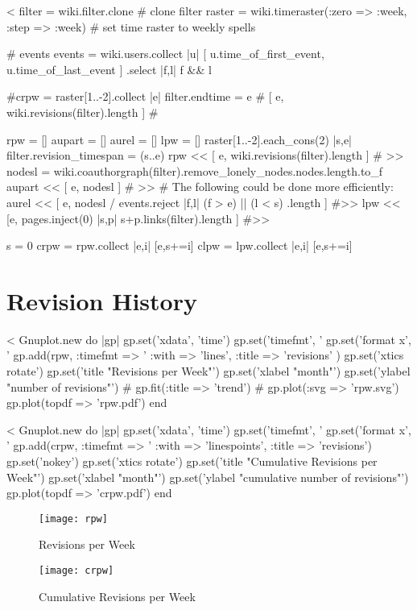 \documentclass{scrartcl}
\begin{document}

<%
filter = wiki.filter.clone # clone filter
raster = wiki.timeraster(:zero => :week, :step => :week) # set time raster to weekly spells

# events
events = wiki.users.collect{ |u| 
	[ u.time_of_first_event, u.time_of_last_event ] 
    }.select { |f,l| f && l }


#crpw = raster[1..-2].collect { |e| filter.endtime = e 
#  [ e, wiki.revisions(filter).length ]
#}

rpw = []
aupart = []
aurel = []
lpw = []
raster[1..-2].each_cons(2) { |s,e| 
  filter.revision_timespan = (s..e)
  rpw << [ e, wiki.revisions(filter).length ] # >>
  nodesl = wiki.coauthorgraph(filter).remove_lonely_nodes.nodes.length.to_f
  aupart << [ e, nodesl ] # >>
  # The following could be done more efficiently:
  aurel << [ e, nodesl / 
                events.reject { |f,l| (f > e) || (l < s) }.length ] #>>
  lpw << [e, pages.inject(0) { |s,p| s+p.links(filter).length } ] #>>
}

s = 0
crpw = rpw.collect { |e,i| [e,s+=i] }
clpw = lpw.collect { |e,i| [e,s+=i] }


\section{Revision History} %
\label{sec:revision_history}

<%
Gnuplot.new do |gp|
	gp.set('xdata', 'time')
	gp.set('timefmt', '%
	gp.set('format x', '%
	gp.add(rpw, :timefmt => '%
		:with => 'lines', 
		:title => 'revisions' )
	gp.set('xtics rotate')
	gp.set('title "Revisions per Week"')
	gp.set('xlabel "month"')
	gp.set('ylabel "number of revisions"')
#	gp.fit(:title => 'trend')
#	gp.plot(:svg => 'rpw.svg')
	gp.plot(topdf => 'rpw.pdf')
end


<%
Gnuplot.new do |gp|
	gp.set('xdata', 'time')
	gp.set('timefmt', '%
	gp.set('format x', '%
	gp.add(crpw, :timefmt => '%
		:with => 'linespoints', 
		:title => 'revisions')
	gp.set('nokey')
	gp.set('xtics rotate')
	gp.set('title "Cumulative Revisions per Week"')
	gp.set('xlabel "month"')
	gp.set('ylabel "cumulative number of revisions"')
	gp.plot(topdf => 'crpw.pdf')
end
\begin{figure}
	\centering
	\texttt{[image: rpw]}
	\caption{Revisions per Week}
	\label{fig:revisions_per_week}
        \vfill

	\texttt{[image: crpw]}
	\caption{Cumulative Revisions per Week}
	\label{fig:cumulative_revisions_per_week}
\end{figure}
\end{document}
